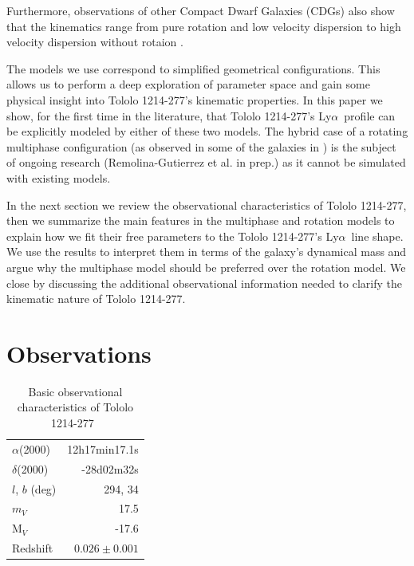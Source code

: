 \documentclass[a4paper,fleqn,usenatbib]{mnras}
\newcommand{\tol}{Tololo 1214-277}
\newcommand{\lya}{\ifmmode{{\rm Ly}\alpha}\else Ly$\alpha$\ \fi}
\begin{document}
Furthermore, observations of other Compact Dwarf Galaxies (CDGs) also show 
that the kinematics range from pure rotation and low velocity
dispersion to high velocity dispersion without rotaion
\citep{2015A&A...577A..21C,2017A&A...600A.125C}.   


The models we use correspond to simplified geometrical configurations.
This allows us to perform a deep exploration of parameter space and
gain some physical insight into \tol's kinematic properties.
In this paper we show, for the first time in the literature, that \tol's
\lya profile can be explicitly modeled by either of these two
models. 
The hybrid case of a rotating multiphase configuration
(as observed in some of the galaxies in \cite{2015A&A...577A..21C}) is
the subject of ongoing research (Remolina-Gutierrez et al. in prep.)  as
it cannot be simulated with existing models.  



In the next section we review the observational characteristics of
\tol, then we summarize the main features in the multiphase and
rotation models to explain how we fit their free parameters 
to the \tol's \lya line shape.
We use the results to interpret them in terms of the galaxy's
dynamical mass and argue why the multiphase model should be preferred
over the rotation model.
We close by discussing the additional observational information needed
to clarify the kinematic nature of \tol. 


\section{Observations}


\begin{table}
\begin{center}
\begin{tabular}{lr}\hline
$\alpha$(2000)& 12h17min17.1s\\
$\delta$(2000)& -28d02m32s\\
$l$, $b$ (deg) & 294, 34\\
$m_V$ & 17.5\\
  M$_V$ & -17.6\\ 
Redshift & $0.026\pm0.001$ \\\hline
\end{tabular}
\end{center}
\caption{Basic observational characteristics of \tol\ 
  \citep{Thuan97}\label{obstable}} 
\end{table}
\end{document}
